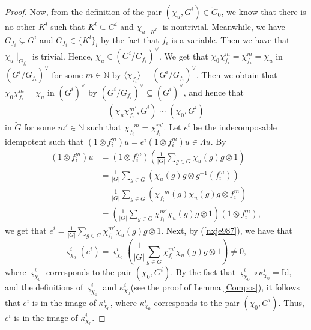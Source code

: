 \documentclass[10pt,a4paper]{amsart}
\begin{document}
\begin{proof}
Now, from the definition of the
pair $(\chi_u, G^i) \in \tilde{G}_0$, we know
that there is no other $K^l$ such that
$K^l \subseteq G^i$ and $\chi_u \mid_{K^l}$ 
is nontrivial.
Meanwhile, we have $G_{f_i} \subsetneq G^i$ and $G_{f_i} \in \{K^l\}_l$ by the fact that $f_i$ is a variable.
Then we have that $\chi_u \mid_{G_{f_i}}$ is trivial. 
Hence, $\chi_u \in (G^i/G_{f_i})^{\vee}$.
We get that $\chi_{0} \chi_{f_i}^{m} = \chi_{f_i}^{m} 
= \chi_u$ in $(G^i/G_{f_i})^{\vee}$ for some $m \in \mathbb{N}$ by $\langle\chi_{f_i}\rangle 
=  (G^i / G_{f_i})^{\vee}$. 
Then we obtain that
$\chi_{0} \chi_{f_i}^{m} = \chi_u$ in $(G^i)^\vee$ by $(G^i/G_{f_i})^{\vee} \subseteq (G^i)^\vee$, and hence
that 
\begin{align}\label{nxje987}
(\chi_u \chi_{f_i}^{m'}, G^i) \sim (\chi_0, G^i)
\end{align}
in $\tilde{G}$ 
for some $m' \in \mathbb{N}$ such that $\chi_{f_i}^{-m} = \chi_{f_i}^{m'}$.
Let $e^i$ be the indecomposable idempotent such that
$ (1 \otimes f_i^{m}) u = e^i (1 \otimes f_i^{m})u \in \Lambda u$. 
By 
\begin{align}\label{jvxw56} 
(1 \otimes f_i^{m})u &= (1 \otimes f_i^{m}) 
(\frac{1}{|G|} \sum\limits_{g \in G} \chi_u(g) g \otimes 1)	 \nonumber \\
&= \frac{1}{|G|} \sum\limits_{g \in G} 
( \chi_u(g) g  \otimes g^{-1}(f_i^{m})) \nonumber \\
& =\displaystyle
\frac{1}{|G|} \sum\limits_{g \in G} 
( \chi_{f_i}^{-m}(g) \chi_u(g) g  \otimes f_i^{m}) \nonumber \\ 
& =(\frac{1}{|G|} \sum\limits_{g \in G} 
\chi^{m'}_{f_i}\chi_u(g)g  \otimes 1 )  (1 \otimes f_i^{m}),
\end{align}
we get that $e^i = \displaystyle
\frac{1}{|G|} 
\sum\limits_{g \in G} 
\chi^{m'}_{f_i}\chi_u(g)g  \otimes 1$. 
Next, by 
(\ref{nxje987}), 
we have that 
$$
\varsigma^{i}_{\chi_0}(e^i)  = \varsigma^{i}_{\chi_0} ( \frac{1}{|G|} 
\sum\limits_{g \in G} \chi^{m'}_{f_i}\chi_u(g)g  \otimes 1 ) \neq 0,
$$ 
where $\varsigma^i_{\chi_0}$ corresponds 
to the pair $(\chi_0, G^i)$. 
By the fact that $\varsigma^{i}_{\chi_0}
\circ \kappa^{i}_{\chi_0} = \mathrm{Id}$, and the definitions of 
$\varsigma^{i}_{\chi_0}$ and $\kappa^{i}_{\chi_0}$(see the proof of Lemma \ref{Compos}), 
it follows that $e^i$ is in the image of $\kappa^i_{\chi_0}$, where 
$\kappa^i_{\chi_0}$ corresponds to the pair $(\chi_0, G^i)$.  
Thus, $e^i$ is in the image of $\bar\kappa^i_{\chi_0}$.


\end{proof}
\end{document}
